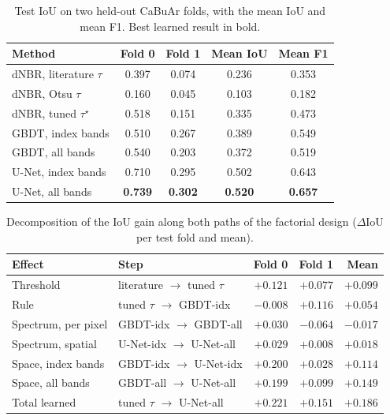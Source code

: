 \documentclass[conference]{IEEEtran}
\begin{document}
\begin{table}[!t]
\centering
\caption{Test IoU on two held-out CaBuAr folds, with the mean IoU and mean F1. Best learned result in bold.}
\label{tab:main}
\setlength{\tabcolsep}{4.5pt}
\begin{tabular}{@{}lcccc@{}}
\toprule
Method & Fold 0 & Fold 1 & Mean IoU & Mean F1 \\
\midrule
dNBR, literature $\tau$ & 0.397 & 0.074 & 0.236 & 0.353 \\
dNBR, Otsu $\tau$       & 0.160 & 0.045 & 0.103 & 0.182 \\
dNBR, tuned $\tau^{\star}$ & 0.518 & 0.151 & 0.335 & 0.473 \\
\midrule
GBDT, index bands  & 0.510 & 0.267 & 0.389 & 0.549 \\
GBDT, all bands    & 0.540 & 0.203 & 0.372 & 0.519 \\
U-Net, index bands & 0.710 & 0.295 & 0.502 & 0.643 \\
U-Net, all bands   & \textbf{0.739} & \textbf{0.302} & \textbf{0.520} & \textbf{0.657} \\
\bottomrule
\end{tabular}
\end{table}

\begin{table}[!t]
\centering
\caption{Decomposition of the IoU gain along both paths of the factorial design ($\Delta$IoU per test fold and mean).}
\label{tab:decomp}
\setlength{\tabcolsep}{3.5pt}
\begin{tabular}{@{}llrrr@{}}
\toprule
Effect & Step & Fold 0 & Fold 1 & Mean \\
\midrule
Threshold & literature $\to$ tuned $\tau$ & $+0.121$ & $+0.077$ & $+0.099$ \\
Rule      & tuned $\tau$ $\to$ GBDT-idx  & $-0.008$ & $+0.116$ & $+0.054$ \\
Spectrum, per pixel & GBDT-idx $\to$ GBDT-all & $+0.030$ & $-0.064$ & $-0.017$ \\
Spectrum, spatial   & U-Net-idx $\to$ U-Net-all & $+0.029$ & $+0.008$ & $+0.018$ \\
Space, index bands  & GBDT-idx $\to$ U-Net-idx & $+0.200$ & $+0.028$ & $+0.114$ \\
Space, all bands    & GBDT-all $\to$ U-Net-all & $+0.199$ & $+0.099$ & $+0.149$ \\
\midrule
Total learned & tuned $\tau$ $\to$ U-Net-all & $+0.221$ & $+0.151$ & $+0.186$ \\
\bottomrule
\end{tabular}
\end{table}
\end{document}
